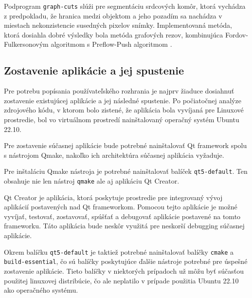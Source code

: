 Podprogram \texttt{graph-cuts} slúži pre segmentáciu srdcových komôr, ktorá vychádza z predpokladu, že hranica medzi objektom a jeho pozadím sa nachádza v miestach nekonzistencie susedných pixelov snímky. Implementovaná metóda, ktorá dosiahla dobré výsledky bola metóda grafových rezov, kombinujúca Fordov-Fulkersonovým algoritmom s Preflow-Push algoritmom \cite{master_thesis_app}.

\subsection {Zostavenie aplikácie a jej spustenie}

Pre potrebu popísania používateľského rozhrania je najprv žiaduce dosiahnuť zostavenie existujúcej aplikácie a jej následné spustenie. Po počiatočnej analýze zdrojového kódu, v ktorom bolo zistené, že aplikácia bola vyvíjaná pre Linuxové prostredie, bol vo virtuálnom prostredí nainštalovaný operačný systém Ubuntu 22.10.

Pre zostavenie súčasnej aplikácie bude potrebné nainštalovať Qt framework spolu s nástrojom Qmake, nakoľko ich architektúra súčasnej aplikácia vyžaduje.

Pre inštaláciu Qmake nástroja je potrebné nainštalovať balíček \texttt{qt5-default}. Ten obsahuje nie len nástroj \texttt{qmake} ale aj aplikáciu Qt Creator.

Qt Creator je aplikácia, ktorá poskytuje prostredie pre integrovaný vývoj aplikácií postavených nad Qt frameworkom. Pomocou tejto aplikácie je možné vyvíjať, testovať, zostavovať, spúšťať a debugovať aplikácie postavené na tomto frameworku. Táto aplikácia bude neskôr využitá pre neskorší debugging súčasnej aplikácie.

Okrem balíčku \texttt{qt5-default} je taktiež potrebné nainštalovať balíčky \texttt{cmake} a \texttt{build-essential}, čo sú balíčky poskytujúce ďalšie nástroje potrebné pre úspešné zostavenie aplikácie. Tieto balíčky v niektorých prípadoch už môžu byť súčasťou použitej linuxovej distribúcie, čo ale neplatilo v prípade použitia Ubuntu 22.10 ako operačného systému.

